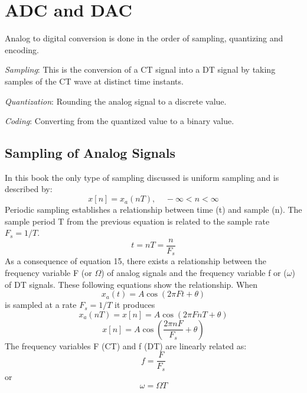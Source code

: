 \documentclass{article} %
\begin{document}
	\section{ADC and DAC}
    Analog to digital conversion is done in the order of sampling, quantizing and encoding.
    
    \!\!\!\!\!\!\!\!\!\textit{Sampling}: This is the conversion of a CT signal into a DT signal by taking samples of the CT wave at distinct time instants.
    
    \!\!\!\!\!\!\!\!\!\textit{Quantization}: Rounding the analog signal to a discrete value. 
    
    \!\!\!\!\!\!\!\!\!\textit{Coding}: Converting from the quantized value to a binary value.
    
    \subsection{Sampling of Analog Signals}
    In this book the only type of sampling discussed is uniform sampling and is described by:
    \begin{equation}  
	x[n] = x_a(nT), \;\;\;\; -\infty < n < \infty
    \end{equation}
    Periodic sampling establishes a relationship between time (t) and sample (n). The sample period T from the previous equation is related to the sample rate $F_s = 1/T$. 
    \begin{equation}  
	t = nT = \frac{n}{F_s}
    \end{equation}
    As a consequence of equation 15, there exists a relationship between the frequency variable F (or $\Omega$) of analog signals and the frequency variable f or ($\omega$) of DT signals. These following equations show the relationship. When
    \begin{equation}  
	x_a(t) = A \cos(2 \pi Ft + \theta)
    \end{equation}
    is sampled at a rate $F_s = 1/T$ it produces
    \begin{equation}  
	x_a(nT) = x[n] = A \cos(2 \pi FnT + \theta)
    \end{equation}
    \begin{equation}  
	x[n] = A \cos(\frac{2 \pi nF}{F_s} + \theta)
    \end{equation}
    The frequency variables F (CT) and f (DT) are linearly related as:
    \begin{equation}  
	f = \frac{F}{F_s}
    \end{equation}
    or 
    \begin{equation}  
	\omega = \Omega T
    \end{equation}
\end{document}
